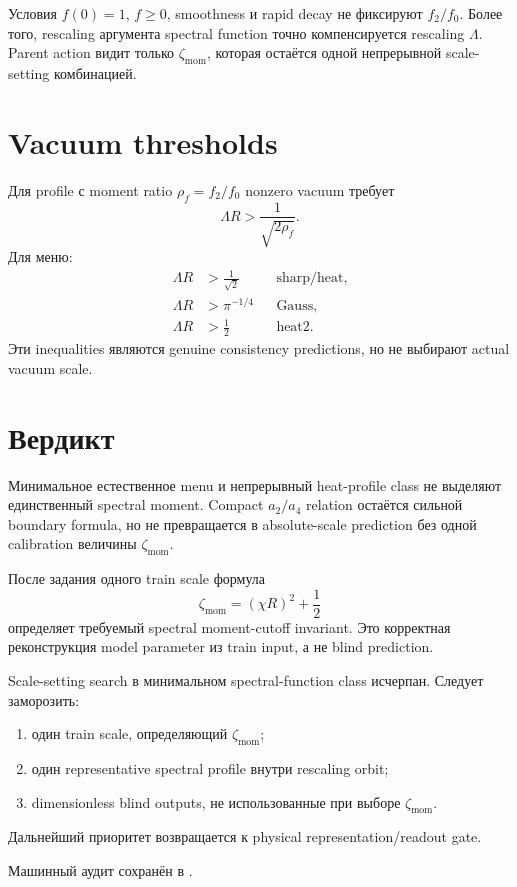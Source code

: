 \begin{theorem}
Условия \(f(0)=1\), \(f\ge0\), smoothness и rapid decay не фиксируют
\(f_2/f_0\). Более того, rescaling аргумента spectral function точно
компенсируется rescaling \(\Lambda\). Parent action видит только
\(\zeta_{\mathrm{mom}}\), которая остаётся одной непрерывной
scale-setting комбинацией.
\end{theorem}

\section{Vacuum thresholds}

Для profile с moment ratio \(\rho_f=f_2/f_0\) nonzero vacuum требует
\begin{equation}
 \Lambda R>\frac1{\sqrt{2\rho_f}}.
\end{equation}
Для меню:
\begin{align}
 \Lambda R&>\frac1{\sqrt2}
 &&\text{sharp/heat},
 \\
 \Lambda R&>\pi^{-1/4}
 &&\text{Gauss},
 \\
 \Lambda R&>\frac12
 &&\text{heat2}.
\end{align}
Эти inequalities являются genuine consistency predictions, но не
выбирают actual vacuum scale.

\section{Вердикт}

\begin{theorem}
Минимальное естественное menu и непрерывный heat-profile class не выделяют
единственный spectral moment. Compact \(a_2/a_4\) relation остаётся
сильной boundary formula, но не превращается в absolute-scale prediction
без одной calibration величины \(\zeta_{\mathrm{mom}}\).
\end{theorem}

После задания одного train scale формула
\begin{equation}
 \zeta_{\mathrm{mom}}
 =(\chi R)^2+\frac12
\end{equation}
определяет требуемый spectral moment-cutoff invariant. Это корректная
реконструкция model parameter из train input, а не blind prediction.

\begin{protocol}
Scale-setting search в минимальном spectral-function class исчерпан.
Следует заморозить:
\begin{enumerate}
 \item один train scale, определяющий \(\zeta_{\mathrm{mom}}\);
 \item один representative spectral profile внутри rescaling orbit;
 \item dimensionless blind outputs, не использованные при выборе
 \(\zeta_{\mathrm{mom}}\).
\end{enumerate}
Дальнейший приоритет возвращается к physical representation/readout gate.
\end{protocol}

Машинный аудит сохранён в
.
